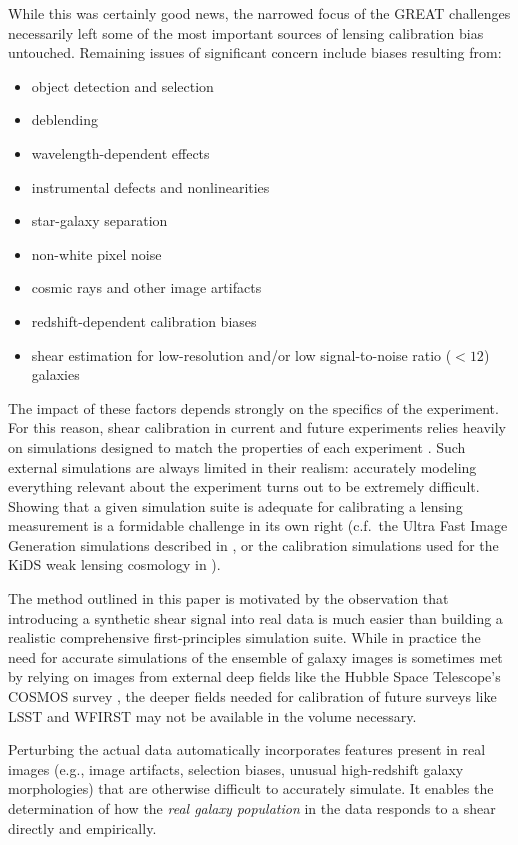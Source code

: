 \documentclass[iop]{emulateapj}
\begin{document}
While this was certainly good news, the narrowed focus of the GREAT
challenges necessarily left some of the most important sources of
lensing calibration bias untouched. Remaining issues of significant
concern include biases resulting from:
\begin{itemize}
\item object detection and selection
\item deblending
\item wavelength-dependent effects
\item instrumental defects and nonlinearities
\item star-galaxy separation
\item non-white pixel noise
\item cosmic rays and other image artifacts
\item redshift-dependent calibration biases
\item shear estimation for low-resolution and/or low signal-to-noise ratio ($<12$) galaxies
\end{itemize}
The impact of these factors depends strongly on the specifics of the
experiment. For this reason, shear calibration in current and future
experiments relies heavily on simulations designed to match the
properties of each experiment
\citep{KiDS450,2016MNRAS.tmp..827J}. Such external simulations are
always limited in their realism:  accurately modeling everything
relevant about the experiment turns out to be extremely difficult. Showing that a given simulation suite
is adequate for calibrating a lensing measurement is a formidable
challenge in its own right (c.f.\ the Ultra Fast Image Generation
simulations described in \citealt{2013A&C.....1...23B}, or the
calibration simulations used for the KiDS weak lensing cosmology in
\citealt{2016arXiv160605337F}).

The method outlined in this paper is motivated by the observation that
introducing a synthetic shear signal into real data is much easier
than building a realistic comprehensive first-principles simulation
suite. While in practice the need for accurate simulations of the
ensemble of galaxy images is sometimes met by relying on images from
external deep fields like the Hubble Space Telescope's COSMOS survey
\citep{2007ApJS..172..196K,2007ApJS..172....1S,2007ApJS..172...38S},
the deeper fields needed for calibration of future surveys like LSST
and WFIRST may not be available in the volume necessary.

 Perturbing the actual data automatically incorporates features
present in real images (e.g., image artifacts, selection biases,
unusual high-redshift galaxy morphologies) that are otherwise
difficult to accurately simulate.  It enables the determination of how the {\em real galaxy
  population} in the data responds to a shear directly and empirically.
\end{document}
